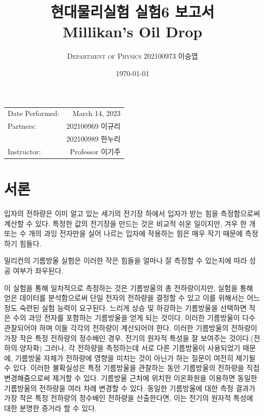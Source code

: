 \documentclass[a4paper, 10pt, nanum]{CSUniSchoolLabReport}
\title{현대물리실험 실험6 보고서 \\ Millikan's Oil Drop} %
\author{\textsc{Department of Physics} 202100973 이승엽}
\date{\today}
\begin{document}
\maketitle %

\begin{center}
	\begin{tabular}{l r}
		Date Performed: & March 14, 2023 \\ %
		Partners: & 202100969 이규리 \\ %
		& 202100989 한누리 \\
		Instructor: & Professor 이기주 %
	\end{tabular}
\end{center}


\maketitle


\section{서론}

	입자의 전하량은 이미 알고 있는 세기의 전기장 하에서 입자가 받는 힘을 측정함으로써 계산할 수 있다. 특정한 값의 전기장을 만드는 것은 비교적 쉬운 일이지만, 겨우 한 개 또는 수 개의 과잉 전자만을 실어 나르는 입자에 작용하는 힘은 매우 작기 때문에 측정하기 힘들다. 

	밀리컨의 기름방울 실험은 이러한 작은 힘들을 얼마나 잘 측정할 수 있는지에 따라 성공 여부가 좌우된다. 

	이 실험을 통해 일차적으로 측정하는 것은 기름방울의 총 전하량이지만, 실험을 통해 얻은 데이터를 분석함으로써 단일 전자의 전하량을 결정할 수 있고 이를 위해서는 어느 정도 숙련된 실험 능력이 요구된다. 느리게 상승 및 하강하는 기름방울을 선택하면 적은 수의 과잉 전자를 포함하는 기름방울을 얻게 되는 것이다. 이러한 기름방울이 다수 관찰되어야 하며 이들 각각의 전하량이 계산되어야 한다. 이러한 기름방울의 전하량이 가장 작은 특정 전하량의 정수배인 경우, 전기의 원자적 특성을 잘 보여주는 것이다.(전하의 양자화) 그러나, 각 전하량을 측정하는데 서로 다른 기름방울이 사용되었기 때문에, 기름방울 자체가 전하량에 영향을 미치는 것이 아닌가 하는 질문이 여전히 제기될 수 있다. 이러한 불확실성은 특정 기름방울을 관찰하는 동안 기름방울의 전하량을 직접 변경해줌으로써 제거할 수 있다. 기름방울 근처에 위치한 이온화원을 이용하면 동일한 기름방울의 전하량을 여러 차례 변경할 수 있다. 동일한 기름방울에 대한 측정 결과가 가장 작은 특정 전하량의 정수배인 전하량을 산출한다면, 이는 전기의 원자적 특성에 대한 분명한 증거라 할 수 있다. 
\end{document}
